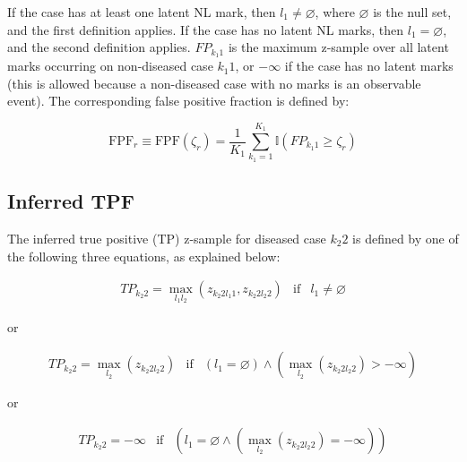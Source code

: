 \documentclass[
]{book}
\begin{document}
If the case has at least one latent NL mark, then \(l_1 \neq \varnothing\), where \(\varnothing\) is the null set, and the first definition applies. If the case has no latent NL marks, then \(l_1 = \varnothing\), and the second definition applies. \(FP_{k_1 1}\) is the maximum z-sample over all latent marks occurring on non-diseased case \(k_1 1\), or \(-\infty\) if the case has no latent marks (this is allowed because a non-diseased case with no marks is an observable event). The corresponding false positive fraction is defined by:

\begin{equation}
\text{FPF}_r \equiv \text{FPF} \left ( \zeta_r \right ) = \frac{1}{K_1} \sum_{k_1=1}^{K_1} \mathbb{I} \left ( FP_{k_1 1} \geq \zeta_r\right )
\label{eq:empirical-fpf}
\end{equation}

\hypertarget{empirical-ROC-tpf}{%
\subsection{Inferred TPF}\label{empirical-ROC-tpf}}

The inferred true positive (TP) z-sample for diseased case \(k_2 2\) is defined by one of the following three equations, as explained below:

\begin{equation}
\begin{matrix}
TP_{k_2 2} = \max_{l_1 l_2}\left ( z_{k_2 2 l_1 1} ,z_{k_2 2 l_2 2}  \right ) & \text{if} & l_1 \neq \varnothing
\end{matrix}
\label{eq:empirical-TP1}
\end{equation}

or

\begin{equation}
\begin{matrix}
TP_{k_2 2} = \max_{l_2}  \left ( z_{k_2 2 l_2 2} \right ) 
 & \text{if} & \left( l_1 = \varnothing \right) \land \left (\max_{l_2}{\left (z_{k_2 2 l_2 2}  \right )} > -\infty  \right )
\end{matrix}
\label{eq:empirical-TP2}
\end{equation}

or

\begin{equation}
\begin{matrix}
TP_{k_2 2} = -\infty 
 & \text{if} & \left ( l_1 = \varnothing \land\left ( \max_{l_2}{\left (z_{k_2 2 l_2 2}  \right )} = -\infty  \right )  \right )
\end{matrix}
\label{eq:empirical-TP3}
\end{equation}
\end{document}
